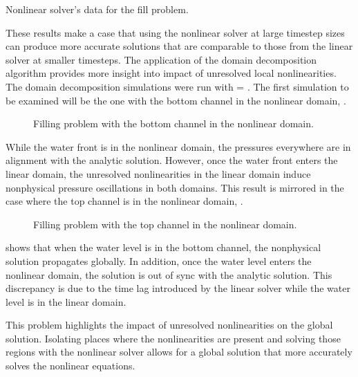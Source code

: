 \begin{table}[h!tb]
\centering
\singlespace

\caption{Nonlinear solver's data for the fill problem.}
\label{tab:vmpNlnRunTime}
\end{table}

These results make a case that using the nonlinear solver at large timestep sizes can produce more accurate solutions that are comparable to those from the linear solver at smaller timesteps.
The application of the domain decomposition algorithm provides more insight into impact of unresolved local nonlinearities.
The domain decomposition simulations were run with \dtmax{} = .
The first simulation to be examined will be the one with the bottom channel in the nonlinear domain, .

\begin{figure}[h!tb]
\centering

\caption{Filling problem with the bottom channel in the nonlinear domain.}
\label{fig:vmpDDBotChan}
\end{figure}

While the water front is in the nonlinear domain, the pressures everywhere are in alignment with the analytic solution.
However, once the water front enters the linear domain, the unresolved nonlinearities in the linear domain induce nonphysical pressure oscillations in both domains.
This result is mirrored in the case where the top channel is in the nonlinear domain, .

\begin{figure}[h!tb]
\centering

\caption{Filling problem with the top channel in the nonlinear domain.}
\label{fig:vmpDDTopChan}
\end{figure}

 shows that when the water level is in the bottom channel, the nonphysical solution propagates globally.
In addition, once the water level enters the nonlinear domain, the solution is out of sync with the analytic solution.
This discrepancy is due to the time lag introduced by the linear solver while the water level is in the linear domain.

This problem highlights the impact of unresolved nonlinearities on the global solution.
Isolating places where the nonlinearities are present and solving those regions with the nonlinear solver allows for a global solution that more accurately solves the nonlinear equations.

